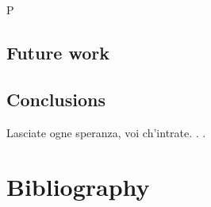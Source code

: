 \documentclass[a4paper, twoside]{templates/ociamthesis}
\begin{document}
P

\hypertarget{future-work}{%
\section{Future work}\label{future-work}}

\hypertarget{conclusions-1}{%
\section{Conclusions}\label{conclusions-1}}

\begin{savequote}
Lasciate ogne speranza, voi ch'intrate. . .
\end{savequote}

\hypertarget{bibliography}{%
\chapter{Bibliography}\label{bibliography}}
\end{document}
